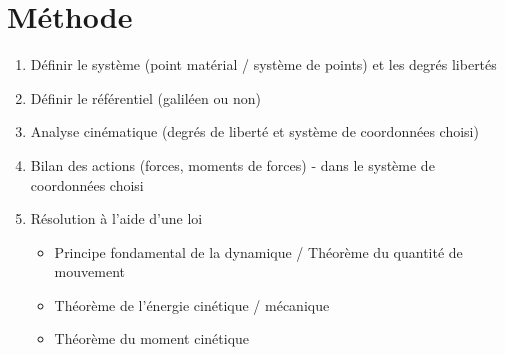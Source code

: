 \documentclass[openany]{book}
\begin{document}
\section{Méthode}
\begin{enumerate}
    \item Définir le système (point matérial / système de points) et les degrés libertés
    \item Définir le référentiel (galiléen ou non)
    \item Analyse cinématique (degrés de liberté et système de coordonnées choisi)
    \item Bilan des actions (forces, moments de forces) - dans le système de coordonnées choisi
    \item Résolution à l'aide d'une loi 
    \begin{itemize}
        \item Principe fondamental de la dynamique / Théorème du quantité de mouvement
        \item Théorème de l'énergie cinétique / mécanique
        \item Théorème du moment cinétique
    \end{itemize}
\end{enumerate}
\end{document}
